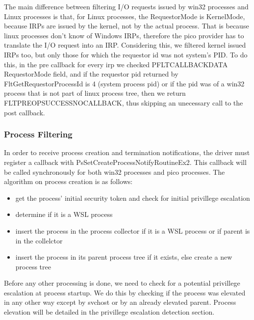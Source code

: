 \documentclass[conference]{IEEEtran}
\begin{document}
    \par{}
    The main difference between filtering I/O requests issued by win32 processes and Linux processes is that, for Linux processes,
    the RequestorMode is KernelMode, because IRPs are issued by the kernel, not by the actual process. That is because linux processes don't know
    of Windows IRPs, therefore the pico provider has to translate the I/O request into an IRP. Considering this, we filtered kernel
    issued IRPs too, but only those for which the requestor id was not system's PID. To do this, in the pre callback for every irp we checked
    PFLT\textunderscore CALLBACK\textunderscore DATA RequestorMode field, and if the requestor pid returned by FltGetRequestorProcessId is 4
    (system process pid) or if the pid was of a win32 process that is not part of linux process tree, then we return
    FLT\textunderscore PREOP\textunderscore SUCCESS\textunderscore NO\textunderscore CALLBACK, thus skipping an unecessary call to the
    post callback.\\


    \subsubsection{Process Filtering}
    In order to receive process creation and termination notifications, the driver must register a callback with
    PsSetCreateProcessNotifyRoutineEx2. This callback will be called synchronously for both win32 processes and pico processes. The algorithm
    on process creation is as follows:
    \begin{itemize}
        \item get the process' initial security token and check for initial privillege escalation
        \item determine if it is a WSL process
        \item insert the process in the process collector if it is a WSL process or if parent is in the collelctor
        \item insert the process in its parent process tree if it exists, else create a new process tree
    \end{itemize}
    
    \par{}
    Before any other processing is done, we need to check for a potential privillege escalation at process startup. We do this by checking if
    the process was elevated in any other way except by svchost or by an already elevated parent. Process elevation will be detailed in the
    privillege escalation detection section.\\
\end{document}

